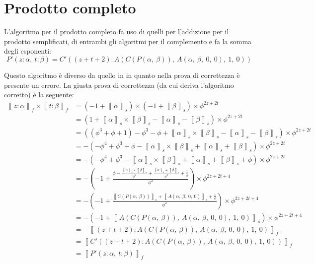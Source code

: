 \documentclass[Lau]{sapthesis}
\begin{document}
\section{Prodotto completo}
L'algoritmo per il prodotto completo fa uso di quelli per l'addizione per il prodotto semplificati, di entrambi gli algoritmi per il complemento e fa la somma degli esponenti:
$$P'(z:\alpha, \ t:\beta) = C'((z+t+2):A(C(P(\alpha, \ \beta)), \ A(\alpha, \ \beta, \ 0, \ 0), \ 1, \ 0))$$

Questo algoritmo è diverso da quello in \cite{PietroDiGianantonio} in quanto nella prova di correttezza è presente un errore. La giusta prova di correttezza (da cui deriva l'algoritmo corretto) è la seguente:
\begin{align*}
\left\llbracket z:\alpha \right\rrbracket_f \times \left\llbracket t:\beta \right\rrbracket_f & = (-1 + \left\llbracket \alpha \right\rrbracket_s) \times (-1 + \left\llbracket \beta \right\rrbracket_s) \times \phi^{2z+2t}\\
& = (1 + \left\llbracket \alpha \right\rrbracket_s \times \left\llbracket \beta \right\rrbracket_s - \left\llbracket \alpha \right\rrbracket_s - \left\llbracket \beta \right\rrbracket_s) \times \phi^{2z+2t}\\
& = ((\phi^3+\phi+1) - \phi^3 - \phi + \left\llbracket \alpha \right\rrbracket_s \times \left\llbracket \beta \right\rrbracket_s - \left\llbracket \alpha \right\rrbracket_s - \left\llbracket \beta \right\rrbracket_s) \times \phi^{2z+2t}\\
& = -(-\phi^4 + \phi^3 + \phi - \left\llbracket \alpha \right\rrbracket_s \times \left\llbracket \beta \right\rrbracket_s + \left\llbracket \alpha \right\rrbracket_s + \left\llbracket \beta \right\rrbracket_s) \times \phi^{2z+2t}\\
& = -(-\phi^4 + \phi^3 - \left\llbracket \alpha \right\rrbracket_s \times \left\llbracket \beta \right\rrbracket_s + \left\llbracket \alpha \right\rrbracket_s + \left\llbracket \beta \right\rrbracket_s + \phi) \times \phi^{2z+2t}\\[0.5cm]
& = -\left(-1 + \frac{\phi - \frac{\left\llbracket \alpha \right\rrbracket_s \times \left\llbracket \beta \right\rrbracket_s}{\phi^2} + \frac{\left\llbracket \alpha \right\rrbracket_s + \left\llbracket \beta \right\rrbracket_s}{\phi^2} + \frac{1}{\phi}}{\phi^2}\right) \times \phi^{2z+2t+4}\\[0.5cm]
& = -\left(-1 + \frac{\left\llbracket C(P(\alpha, \ \beta)) \right\rrbracket_s + \left\llbracket A(\alpha, \ \beta, \ 0, \ 0) \right\rrbracket_s + \frac{1}{\phi}}{\phi^2}\right) \times \phi^{2z+2t+4}\\[0.5cm]
& = -(-1 + \left\llbracket A(C(P(\alpha, \ \beta)), \ A(\alpha, \ \beta, \ 0, \ 0) , \ 1, \ 0) \right\rrbracket_s) \times \phi^{2z+2t+4}\\
& = -\left\llbracket (z+t+2):A(C(P(\alpha, \ \beta)), \ A(\alpha, \ \beta, \ 0, \ 0), \ 1, \ 0) \right\rrbracket_f\\
& = \left\llbracket C'((z+t+2):A(C(P(\alpha, \ \beta)), \ A(\alpha, \ \beta, \ 0, \ 0), \ 1, \ 0)) \right\rrbracket_f\\
& = \left\llbracket P'(z:\alpha, \ t:\beta) \right\rrbracket_f
\end{align*}
\end{document}
